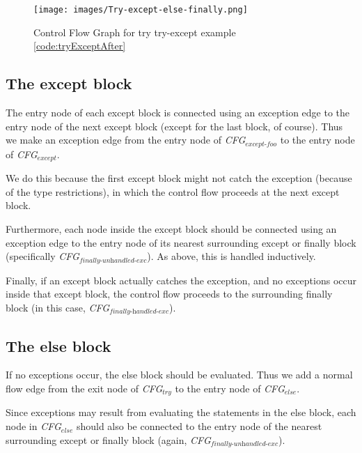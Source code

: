 \begin{figure}
  \vspace{-20pt}
  \begin{center}
    \texttt{[image: images/Try-except-else-finally.png]}
  \end{center}
  \vspace{-10pt}
  \caption{Control Flow Graph for try try-except example \ref{code:tryExceptAfter}}
  \label{fig:tryExceptCfg}
  \vspace{-10pt}
\end{figure}



\subsection{The except block}
The entry node of each except block is connected using an exception edge to the entry node of the next except block (except for the last block, of course). 
Thus we make an exception edge from the entry node of \textit{CFG$_{\textit{except-foo}}$} to the entry node of \textit{CFG$_{\textit{except}}$}.

We do this because the first except block might not catch the exception (because of the type restrictions), 
in which the control flow proceeds at the next except block.

Furthermore, each node inside the except block should be connected using an exception edge to the entry node
 of its nearest surrounding except or finally block (specifically \textit{CFG$_{\textit{finally-unhandled-exc}}$}). As above, this is handled inductively.

Finally, if an except block actually catches the exception, and no exceptions occur inside that except block, 
the control flow proceeds to the surrounding finally block (in this case, \textit{CFG$_{\textit{finally-handled-exc}}$}). 



\subsection{The else block}
If no exceptions occur, the else block should be evaluated. Thus we add a normal flow edge from the exit node of \textit{CFG$_{\textit{try}}$} 
to the entry node of \textit{CFG$_{\textit{else}}$}.

Since exceptions may result from evaluating the statements in the else block, each node in \textit{CFG$_{\textit{else}}$} 
should also be connected to the entry node of the nearest surrounding except or finally block (again, \textit{CFG$_{\textit{finally-unhandled-exc}}$}).

